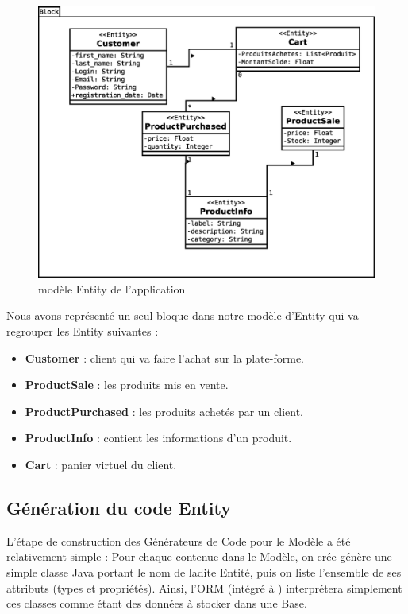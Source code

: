 \begin{figure}[H]
  \centering
  \includegraphics[scale=.4]{img/Entitymodel.eps}
  \caption{modèle Entity de l'application}
  \label{fig:entMod}
\end{figure}

Nous avons représenté un seul bloque dans notre modèle d'Entity qui va regrouper les Entity suivantes :  

\begin{itemize}
  \item[\textbullet] \textbf{Customer} :  client qui va faire l'achat sur la plate-forme.
  \item[\textbullet] \textbf{ProductSale} : les produits mis en vente.
  \item[\textbullet] \textbf{ProductPurchased} : les produits achetés par un client.
  \item[\textbullet] \textbf{ProductInfo} : contient les informations d'un produit.
  \item[\textbullet] \textbf{Cart} : panier virtuel du client.
\end{itemize}

\subsection{Génération du code Entity}

L'étape de construction des Générateurs de Code pour le Modèle \kwentity a été relativement simple : Pour chaque \kwentity contenue dans le Modèle, on crée génère une simple classe Java portant le nom de ladite Entité, puis on liste l'ensemble de ses attributs (types et propriétés). Ainsi, l'ORM \kwebean (intégré à \kwplay) interprétera simplement ces classes comme étant des données à stocker dans une Base.


